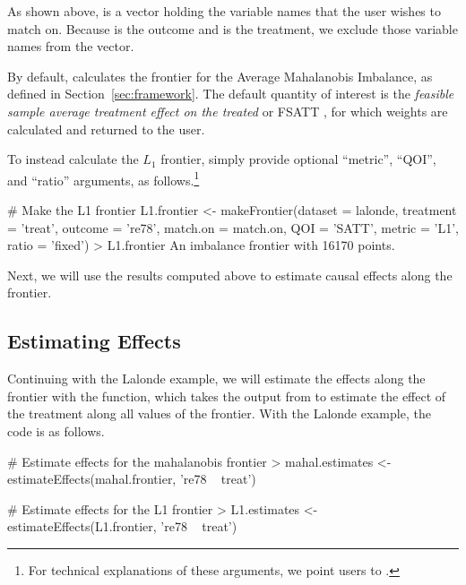 \documentclass[nojss]{jss}
\begin{document}
As shown above,  is a vector holding the variable names
that the user wishes to match on. Because  is
the outcome and  is the treatment, we exclude those
variable names from the vector.

By default,  calculates the frontier for the
Average Mahalanobis Imbalance, as defined in
Section~\ref{sec:framework}.  The default quantity of interest is the
\emph{feasible sample average treatment effect on the treated} or
FSATT \citep{kingND}, for which weights are calculated and returned to the
user. 

To instead calculate the $L_1$ frontier, simply
provide optional ``metric'', ``QOI'', and ``ratio'' arguments, as
follows.\footnote{For technical explanations of these arguments, we
  point users to \citet{kingND}.}

\begin{CodeChunk}
\begin{CodeInput}
# Make the L1 frontier
L1.frontier <- makeFrontier(dataset = lalonde, 
                            treatment = 'treat', 
                            outcome = 're78', 
                            match.on = match.on,
                            QOI = 'SATT',
                            metric = 'L1',
                            ratio = 'fixed')
> L1.frontier
An imbalance frontier with 16170 points.
\end{CodeInput}
\end{CodeChunk}

Next, we will use the results computed above to estimate causal
effects along the frontier.

\subsection{Estimating Effects}

Continuing with the Lalonde example, we will estimate the effects
along the frontier with the  function, which
takes the output from  to estimate the effect of
the treatment along all values of the frontier. With the Lalonde
example, the code is as follows.

\begin{CodeChunk}
\begin{CodeInput}
# Estimate effects for the mahalanobis frontier
> mahal.estimates <- estimateEffects(mahal.frontier, 're78 ~ treat')

# Estimate effects for the L1 frontier
> L1.estimates <- estimateEffects(L1.frontier, 're78 ~ treat')
\end{CodeInput}
\end{CodeChunk}
\end{document}

